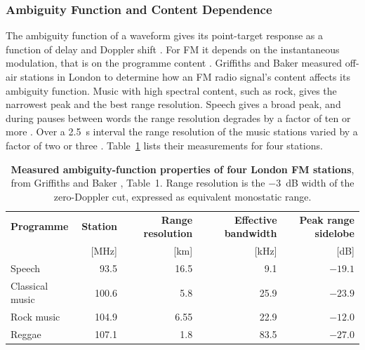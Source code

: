 
\subsubsection{Ambiguity Function and Content Dependence}
\label{subsubsec:ch2.pbr.fm.ambiguity}

The ambiguity function of a waveform gives its point-target response as a function of delay and Doppler shift \citep{griffiths2007}. For FM it depends on the instantaneous modulation, that is on the programme content \citep{griffiths2005af,griffiths2007}. Griffiths and Baker \citep{griffiths2005af} measured off-air stations in London to determine how an FM radio signal's content affects its ambiguity function. Music with high spectral content, such as rock, gives the narrowest peak and the best range resolution. Speech gives a broad peak, and during pauses between words the range resolution degrades by a factor of ten or more \citep{griffiths2005af}. Over a 2.5~s interval the range resolution of the music stations varied by a factor of two or three \citep{griffiths2005af}. Table~\ref{table:ch2.fm-ambiguity} lists their measurements for four stations.

\begin{table}[H]
    \centering
    \caption[Measured ambiguity-function properties of four FM stations]{\textbf{Measured ambiguity-function properties of four London FM stations}, from Griffiths and Baker \citep{griffiths2005af}, Table~1. Range resolution is the $-3$~dB width of the zero-Doppler cut, expressed as equivalent monostatic range.}
    \begin{tabular}{lrrrr}
    \toprule
    \textbf{Programme} & \textbf{Station} & \textbf{Range resolution} & \textbf{Effective bandwidth} & \textbf{Peak range sidelobe} \\
                       & [MHz]            & [km]                      & [kHz]                        & [dB] \\
    \midrule
    Speech          & 93.5  & 16.5 & 9.1  & $-19.1$ \\
    Classical music & 100.6 & 5.8  & 25.9 & $-23.9$ \\
    Rock music      & 104.9 & 6.55 & 22.9 & $-12.0$ \\
    Reggae          & 107.1 & 1.8  & 83.5 & $-27.0$ \\
    \bottomrule
    \end{tabular}
    \label{table:ch2.fm-ambiguity}
\end{table}

